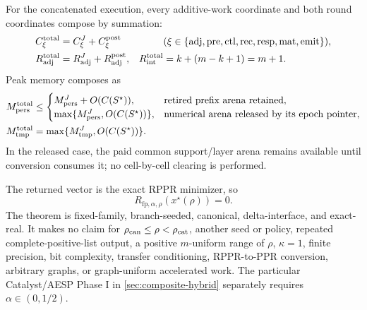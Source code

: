 \begin{theorem}
For the concatenated execution, every additive-work coordinate and both round
coordinates compose by summation:
\begin{align*}
 C_\xi^{\rm total}&=C_\xi^J+C_\xi^{\rm post}
 &&(\xi\in\{\mathrm{adj},\mathrm{pre},\mathrm{ctl},\mathrm{rec},
               \mathrm{resp},\mathrm{mat},\mathrm{emit}\}),\\
 R_{\rm adj}^{\rm total}&=R_{\rm adj}^J+R_{\rm adj}^{\rm post},
 &R_{\rm int}^{\rm total}&=k+(m-k+1)=m+1.
\end{align*}
Peak memory composes as
\begin{align}
 M_{\rm pers}^{\rm total}&\leq
 \begin{cases}
  M_{\rm pers}^J+O(C(S^\star)),&\text{retired prefix arena retained},\\
  \max\{M_{\rm pers}^J,O(C(S^\star))\},
      &\text{numerical arena released by its epoch pointer},
 \end{cases}
 \notag\\
 M_{\rm tmp}^{\rm total}
 &=\max\{M_{\rm tmp}^J,O(C(S^\star))\}.
 \label{eq:branch-caterpillar-composite-memory-composition}
\end{align}
In the released case, the paid common support/layer arena remains available
until conversion consumes it; no cell-by-cell clearing is performed.

The returned vector is the exact RPPR minimizer, so
\begin{equation}
 R_{\mathrm{fp},\alpha,\rho}(x^\star(\rho))=0.
 \label{eq:branch-caterpillar-composite-terminal-proximal}
\end{equation}
The theorem is fixed-family, branch-seeded, canonical, delta-interface, and
exact-real.  It makes no claim for $\rho_{\rm can}\leq\rho<\rho_{\rm cat}$,
another seed or policy, repeated complete-positive-list output, a positive
$m$-uniform range of $\rho$, $\kappa=1$, finite precision, bit complexity,
transfer conditioning, RPPR-to-PPR conversion, arbitrary graphs, or
graph-uniform accelerated work.  The particular Catalyst/AESP Phase I in
\cref{sec:composite-hybrid} separately requires $\alpha\in(0,1/2)$.
\end{theorem}

